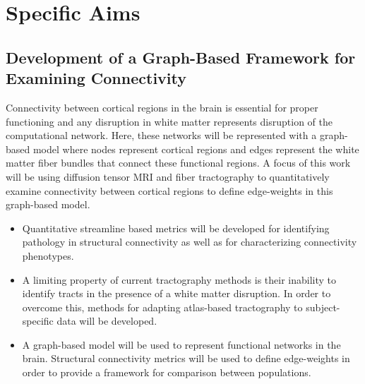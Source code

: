 %
\chapter{Specific Aims}
\label{chap__aims}

\section{Development of a Graph-Based Framework for Examining Connectivity}
Connectivity between cortical regions in the brain is essential for proper functioning and any disruption in white matter represents disruption of the computational network. Here, these networks will be represented with a graph-based model where nodes represent cortical regions and edges represent the white matter fiber bundles that connect these functional regions. A focus of this work will be using diffusion tensor MRI and fiber tractography to quantitatively examine connectivity between cortical regions to define edge-weights in this graph-based model.  

\begin{itemize}
\item
Quantitative streamline based metrics will be developed for identifying pathology in structural connectivity as well as for characterizing connectivity phenotypes.

\item
A limiting property of current tractography methods is their inability to identify tracts in the presence of a white matter disruption. In order to overcome this, methods for adapting atlas-based tractography to subject-specific data will be developed.


\item
A graph-based model will be used to represent functional networks in the brain. Structural connectivity metrics will be used to define edge-weights in order to provide a framework for comparison between populations.

\end{itemize}

